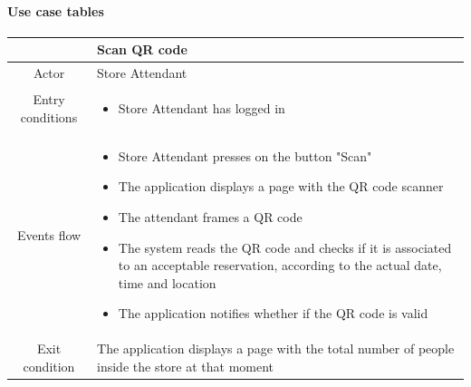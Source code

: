 \documentclass[table, 12pt]{article}
\begin{document}
\paragraph{Use case tables}

\begin{longtable}{|c| p{10cm}|}
    \hline
                     & Scan QR code                                                                                                                                                                                                                                                       \\
    \hline
    Actor            & Store Attendant                                                                                                                                                                                                                                                    \\
    \hline
    Entry conditions & \begin{itemize}
        \item Store Attendant has logged in
    \end{itemize}                                                                                                                                                                                                                                         \\
    \hline
    Events flow      & \begin{itemize}[nosep,after=\strut]
        \item Store Attendant presses on the button "Scan"
        \item The application displays a page with the QR code scanner
        \item The attendant frames a QR code
        \item The system reads the QR code and checks if it is associated to an acceptable reservation, according to the actual date, time and location
        \item The application notifies whether if the QR code is valid
    \end{itemize}                                                                                                                                                                                                                                         \\
    \hline
    Exit condition   & The application displays a page with the total number of people inside the store at that moment

\end{longtable}
\end{document}
